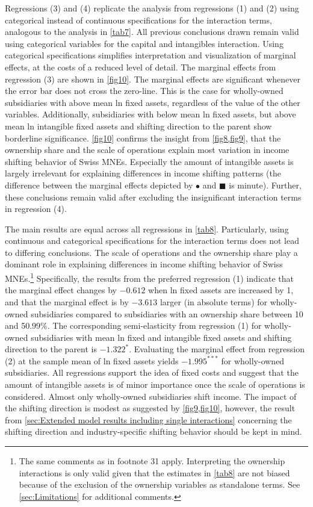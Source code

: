\documentclass[10pt,twocolumn,oneside,cmyk]{article}
\begin{document}
Regressions (3) and (4) replicate the analysis from regressions (1) and (2) using categorical instead of continuous specifications for the interaction terms, analogous to the analysis in \cref{tab7}. All previous conclusions drawn remain valid using categorical variables for the capital and intangibles interaction. Using categorical specifications simplifies interpretation and visualization of marginal effects, at the costs of a reduced level of detail. The marginal effects from regression (3) are shown in \cref{fig10}. The marginal effects are significant whenever the error bar does not cross the zero-line. This is the case for wholly-owned subsidiaries with above mean ln fixed assets, regardless of the value of the other variables. Additionally, subsidiaries with below mean ln fixed assets, but above mean ln intangible fixed assets and shifting direction to the parent show borderline significance. \cref{fig10} confirms the insight from \cref{fig8,fig9}, that the ownership share and the scale of operations explain most variation in income shifting behavior of Swiss MNEs. Especially the amount of intangible assets is largely irrelevant for explaining differences in income shifting patterns (the difference between the marginal effects depicted by $\bullet$ and $\blacksquare$ is minute). Further, these conclusions remain valid after excluding the insignificant interaction terms in regression (4).

The main results are equal across all regressions in \cref{tab8}. Particularly, using continuous and categorical specifications for the interaction terms does not lead to differing conclusions. The scale of operations and the ownership share play a dominant role in explaining differences in income shifting behavior of Swiss MNEs.\footnote{The same comments as in footnote 31 apply. Interpreting the ownership interactions is only valid given that the estimates in \cref{tab8} are not biased because of the exclusion of the ownership variables as standalone terms. See \cref{sec:Limitations} for additional comments.} Specifically, the results from the preferred regression (1) indicate that the marginal effect changes by $-0.612$ when ln fixed assets are increased by 1, and that the marginal effect is by $-3.613$ larger (in absolute terms) for wholly-owned subsidiaries compared to subsidiaries with an ownership share between 10 and 50.99\%. The corresponding semi-elasticity from regression (1) for wholly-owned subsidiaries with mean ln fixed and intangible fixed assets and shifting direction to the parent is $-1.322^*$. Evaluating the marginal effect from regression (2) at the sample mean of ln fixed assets yields $-1.995^{***}$ for wholly-owned subsidiaries. All regressions support the idea of fixed costs and suggest that the amount of intangible assets is of minor importance once the scale of operations is considered. Almost only wholly-owned subsidiaries shift income. The impact of the shifting direction is modest as suggested by \cref{fig9,fig10}, however, the result from \cref{sec:Extended model results including single interactions} concerning the shifting direction and industry-specific shifting behavior should be kept in mind.
\end{document}
